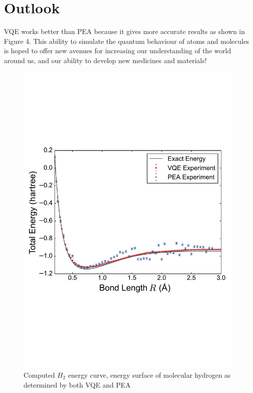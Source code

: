 \documentclass[14pt,landscape,color=UCLdarkred,margin=3cm]{uclposter}
\begin{document}
\begin{multicols}{3}
\begin{figure}[H]
   
\end{figure}



\section*{Outlook}

VQE works better than PEA because it gives more accurate results as shown in Figure 4. This ability to simulate the quantum behaviour of atoms and molecules is hoped to offer new avenues for increasing our understanding of the world around us, and our ability to develop new medicines and materials!

\begin{figure}[H]
  \begin{center}
  \includegraphics[scale=1.45]{result.pdf}
  \caption{Computed $H_2$ energy curve, energy surface of molecular hydrogen as determined by both VQE and PEA}
  \end{center}
    
 

   
\end{figure}



\end{multicols}
	
\end{document}
